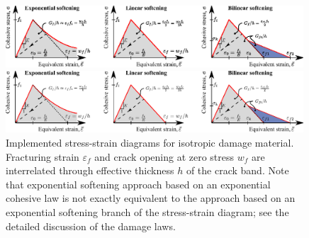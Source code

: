 \documentclass[a4paper]{article}
\begin{document}
\begin{figure}[!htb]
\begin{htmlonly}
  \centerline{\includegraphics[width=0.99\textwidth]{Damage_material_diag.eps}}
\end{htmlonly}
 \centerline{\includegraphics[width=0.99\textwidth]{Damage_material_diag}}
  \caption{Implemented stress-strain diagrams for isotropic damage material. Fracturing strain $\varepsilon_f$ and crack opening at zero stress $w_f$ are interrelated through effective thickness $h$ of the crack band. Note that exponential softening approach based on an exponential cohesive law is not exactly equivalent to the approach based on an exponential softening branch of the stress-strain diagram; see the detailed discussion of the damage laws.}
  \label{idm_softening}
\end{figure}
\end{document}
